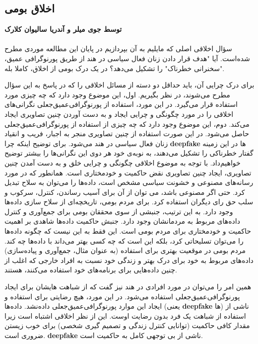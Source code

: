 {
\subsection*{اخلاق بومی}
\label{subsec:اخلاق بومی}
\noindent \textbf{توسط جوی میلر و آندریا سالیوان کلارک}
\\\\
سؤال اخلاقی اصلی که مایلیم به آن بپردازیم در پایان این مطالعه موردی مطرح شده‌است. آیا "هدف قرار دادن زنان فعال سیاسی در هند از طریق پورنوگرافی عمیق، "سخنرانی خطرناک" را تشکیل می‌دهد؟ در یک درک بومی از اخلاق، کاملا بله.
}

برای درک چرایی آن، باید حداقل دو دسته از مسائل اخلاقی را که در پاسخ به این سؤال مطرح می‌شوند، در نظر بگیریم.
اول، این موضوع وجود دارد که چه چیزی مورد استفاده قرار می‌گیرد.
در این مورد، استفاده از پورنوگرافی‌عمیق‌جعلی نگرانی‌های اخلاقی را در مورد چگونگی و چرایی ایجاد و به دست آوردن چنین تصاویری ایجاد می‌کند.
دوم، این موضوع وجود دارد که چه چیزی از استفاده از پورنوگرافی‌عمیق‌جعلی حاصل می‌شود.
در این صورت استفاده از چنین تصاویری منجر به اجبار، فریب و انقیاد زنان فعال سیاسی در هند می‌شود.
برای توضیح اینکه چرا \textenglish{\textbf{deepfake}} ها در این زمینه گفتار خطرناکی را تشکیل می‌دهند، به نوبه‌ی خود هر دوی این نگرانی‌ها را بیشتر توضیح خواهیم‌داد.
با توجه به موضوع اخلاقی چگونگی و چرایی خلق و به دست آمدن چنین تصاویری، ایجاد چنین تصاویری نقض حاکمیت و خودمختاری است.
همانطور که در مورد رسانه‌های مصنوعی و خشونت سیاسی مشخص است، داده‌ها را می‌توان به سلاح تبدیل کرد.
حتی اگر مصنوعی باشد، می توان از آن برای آسیب رساندن، کنترل، سرکوب و سلب حق رای دیگران استفاده کرد.
برای مردم بومی، تاریخچه‌ای از سلاح سازی داده‌ها وجود دارد.
به این ترتیب، جنبشی از سوی محققان بومی برای جمع‌آوری و کنترل داده‌های مربوط به مردمانشان وجود دارد.
جنبش حاکمیت داده‌ها شاهدی بر اهمیت حاکمیت و خودمختاری برای مردم بومی است.
این فقط به این نیست که چگونه داده‌ها را می‌توان تسلیحاتی کرد، بلکه این است که چه کسی بهتر می‌داند با داده‌ها چه کند.
مردم بومی در موقعیت بهتری برای استفاده (به عنوان مثال، جمع‌آوری و پیاده‌سازی) داده‌های مربوط به خود برای درک بهتر و زندگی خود نسبت به افراد خارجی که اغلب از چنین داده‌هایی برای برنامه‌های خود استفاده می‌کنند، هستند.

همین امر را می‌توان در مورد افرادی در هند نیز گفت که از شباهت هایشان برای ایجاد پورنوگرافی‌عمیق‌جعلی استفاده می‌شود.
در این مورد، هیچ رضایتی برای استفاده و ایجاد این موارد پورنوگرافی‌عمیق‌جعلی داده‌نشد.
داده‌ها (یعنی \textenglish{\textbf{deepfake}} ها) ناشی از استفاده از شباهت یک فرد بدون رضایت اوست.
این از نظر اخلاقی اشتباه است زیرا مقدار کافی حاکمیت (توانایی کنترل زندگی و تصمیم گیری شخصی) برای خوب زیستن ضروری است.
\textenglish{\textbf{deepfake}} ناشی از بی توجهی کامل به حاکمیت است.

